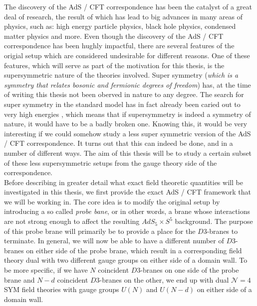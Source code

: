 The discovery of the AdS / CFT correspondence has been the catalyst of a great deal of research, the result of which has lead to big advances in many areas of physics, such as: high energy particle physics, black hole physics, condensed matter physics and more. Even though the discovery of the AdS / CFT correspondence has been hughly impactful, there are several features of the origial setup which are considered undesirable for different reasons. One of these features, which will serve as part of the motivation for this thesis, is the supersymmetric nature of the theories involved. Super symmetry (\textit{which is a symmetry that relates bosonic and fermionic degrees of freedom}) has, at the time of writing this thesis not been oberved in nature to any degree. The search for super symmetry in the standard model has in fact already been caried out to very high energies \cite{Search for SUSY}, which means that if supersymmetry is indeed a symmetry of nature, it would have to be a badly broken one. Knowing this, it would be very interesting if we could somehow study a less super symmetric version of the AdS / CFT correspondence. It turns out that this can indeed be done, and in a number of different ways. The aim of this thesis will be to study a certain subset of these less supersymmetric setups from the gauge theory side of the correspondence.\\
Before describing in greater detail what exact field theoretic quantities will be investigated in this thesis, we first provide the exact AdS / CFT framework that we will be working in. The core idea is to modify the original setup by introducing a so called \textit{probe bane}, or in other words, a brane whose interactions are not strong enough to affect the resulting $AdS_5 \times S^5$ background. The purpose of this probe brane will primarily be to provide a place for the $D3$-branes to terminate. In general, we will now be able to have a different number of $D3$-branes on either side of the probe brane, which result in a corresponding field theory dual with two different gauge groups on either side of a domain wall. To be more specific, if we have $N$ coincident $D3$-branes on one side of the probe brane and $N-d$ coincident $D3$-branes on the other, we end up with dual $\mathcal{N}=4$ SYM field theories with gauge groups $U(N)$ and $U(N-d)$ on either side of a domain wall.\\

